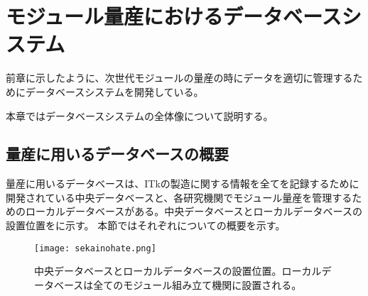 \chapter{モジュール量産におけるデータベースシステム}
\label{sec:chap6}

前章に示したように、次世代モジュールの量産の時にデータを適切に管理するためにデータベースシステムを開発している。

本章ではデータベースシステムの全体像について説明する。


\section{量産に用いるデータベースの概要}
\label{sec:DBforMasspro}

量産に用いるデータベースは、ITkの製造に関する情報を全てを記録するために開発されている中央データベースと、各研究機関でモジュール量産を管理するためのローカルデータベースがある。中央データベースとローカルデータベースの設置位置をに示す。
本節ではそれぞれについての概要を示す。
\begin{figure}[tbp]
  \centering
  \texttt{[image: sekainohate.png]}
  \caption[中央データベースとローカルデータベースの設置位置]{中央データベースとローカルデータベースの設置位置。ローカルデータベースは全てのモジュール組み立て機関に設置される。}
  \label{fig:sekainohate}
\end{figure}

